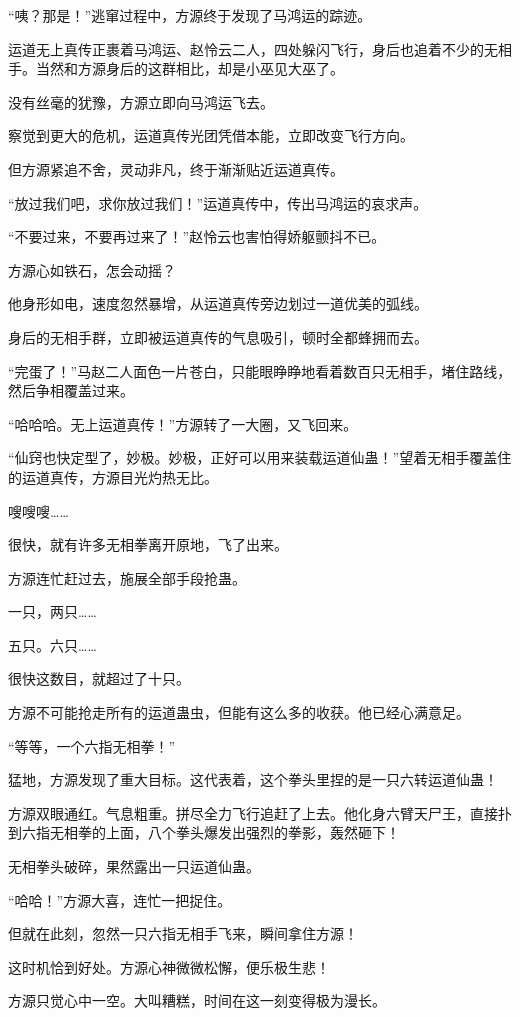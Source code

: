 \begin{this_body}
“咦？那是！”逃窜过程中，方源终于发现了马鸿运的踪迹。

运道无上真传正裹着马鸿运、赵怜云二人，四处躲闪飞行，身后也追着不少的无相手。当然和方源身后的这群相比，却是小巫见大巫了。

没有丝毫的犹豫，方源立即向马鸿运飞去。

察觉到更大的危机，运道真传光团凭借本能，立即改变飞行方向。

但方源紧追不舍，灵动非凡，终于渐渐贴近运道真传。

“放过我们吧，求你放过我们！”运道真传中，传出马鸿运的哀求声。

“不要过来，不要再过来了！”赵怜云也害怕得娇躯颤抖不已。

方源心如铁石，怎会动摇？

他身形如电，速度忽然暴增，从运道真传旁边划过一道优美的弧线。

身后的无相手群，立即被运道真传的气息吸引，顿时全都蜂拥而去。

“完蛋了！”马赵二人面色一片苍白，只能眼睁睁地看着数百只无相手，堵住路线，然后争相覆盖过来。

“哈哈哈。无上运道真传！”方源转了一大圈，又飞回来。

“仙窍也快定型了，妙极。妙极，正好可以用来装载运道仙蛊！”望着无相手覆盖住的运道真传，方源目光灼热无比。

嗖嗖嗖……

很快，就有许多无相拳离开原地，飞了出来。

方源连忙赶过去，施展全部手段抢蛊。

一只，两只……

五只。六只……

很快这数目，就超过了十只。

方源不可能抢走所有的运道蛊虫，但能有这么多的收获。他已经心满意足。

“等等，一个六指无相拳！”

猛地，方源发现了重大目标。这代表着，这个拳头里捏的是一只六转运道仙蛊！

方源双眼通红。气息粗重。拼尽全力飞行追赶了上去。他化身六臂天尸王，直接扑到六指无相拳的上面，八个拳头爆发出强烈的拳影，轰然砸下！

无相拳头破碎，果然露出一只运道仙蛊。

“哈哈！”方源大喜，连忙一把捉住。

但就在此刻，忽然一只六指无相手飞来，瞬间拿住方源！

这时机恰到好处。方源心神微微松懈，便乐极生悲！

方源只觉心中一空。大叫糟糕，时间在这一刻变得极为漫长。


\end{this_body}

